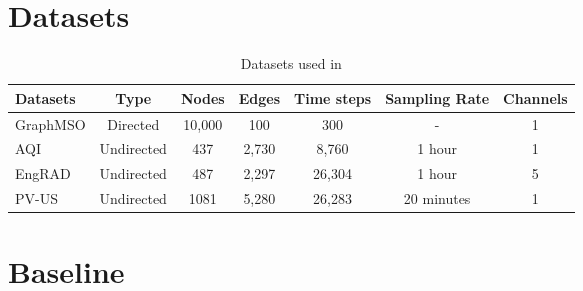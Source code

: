 \documentclass{article}
\theoremstyle{plain}
\theoremstyle{definition}
\theoremstyle{remark}
\begin{document}
\nocite{}





\newpage
\appendix
\onecolumn
\section{Datasets}

\begin{table}[h!] \label{datasets}
\centering
\begin{tabular}{@{}lcccccc@{}}
\toprule
\textbf{Datasets} & \textbf{Type}       & \textbf{Nodes} & \textbf{Edges} & \textbf{Time steps} & \textbf{Sampling Rate} & \textbf{Channels} \\ \midrule
GraphMSO          & Directed            & 10,000         & 100            & 300                 & -                    & 1                 \\
AQI               & Undirected          & 437            & 2,730          & 8,760               & 1 hour                 & 1                 \\
EngRAD            & Undirected          & 487            & 2,297          & 26,304              & 1 hour                 & 5                 \\
PV-US             & Undirected          & 1081           & 5,280          & 26,283              & 20 minutes             & 1                 \\ \bottomrule
\end{tabular}
\caption{Datasets used in \cite{marisca2024graph}}
\label{tab:datasets}
\end{table}

\section{Baseline}
\end{document}
